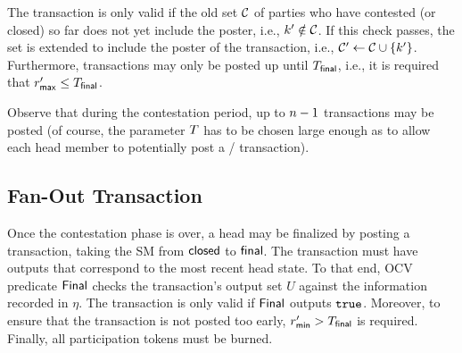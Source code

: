 The \mtxContest{} transaction is only valid if the old set
$\mathcal C$ of parties who have contested (or closed) so far does not yet
include the poster, i.e., $k' \notin \mathcal C$.  If this check
passes, the set is extended to include the poster of the \mtxContest{}
transaction, i.e., $\mathcal C' \gets \mathcal C \cup \{k'\}$.
Furthermore, \mtxContest{} transactions may only be posted up until
$T_{\mathsf{final}}$, i.e., it is required that $r_{\mathsf{max}}' \leq T_{\mathsf{final}}$.

Observe that during the contestation period, up to $n-1$
\mtxContest{} transactions may be posted (of course, the parameter
$T$ has to be chosen large enough as to allow each head member to
potentially post a \mtxClose{}/\mtxContest{} transaction).






\subsection{Fan-Out Transaction}  

Once the contestation phase is over, a head
may be finalized by posting a \mtxFanout{} transaction, taking the SM
from $\mathsf{closed}$ to $\mathsf{final}$.  The \mtxFanout{} transaction must
have outputs that correspond to the most recent head state.  To that
end, OCV predicate $\mathsf{Final}$ checks the transaction's output set $U$
against the information recorded in $\eta$.  The \mtxFanout{}
transaction is only valid if $\mathsf{Final}$ outputs $\mathtt{true}$.  Moreover,
to ensure that the \mtxFanout{} transaction is not posted too early,
$r_{\mathsf{min}}' > T_{\mathsf{final}}$ is required.  Finally, all participation tokens
must be burned.


